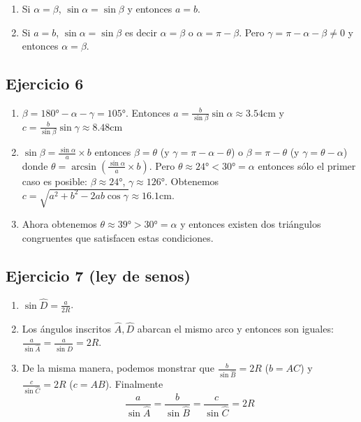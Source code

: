 \begin{enumerate}
  \item Si $\alpha=\beta$, $\sin \alpha = \sin \beta$ y
    entonces $a=b$.
  \item Si $a=b$, $\sin \alpha = \sin \beta$ es decir
    $\alpha = \beta$ o $\alpha = \pi - \beta$.
    Pero $\gamma = \pi - \alpha - \beta \neq 0$ y entonces $\alpha = \beta$.
\end{enumerate}

\subsection{Ejercicio 6}

\begin{enumerate}
\item $\beta = 180° - \alpha - \gamma = 105°$. Entonces
$a = \frac{b}{\sin \beta} \sin \alpha \approx
3.54 \text{cm}$ y
$c = \frac{b}{\sin \beta} \sin \gamma \approx 8.48 \text{cm}$

\item $\sin \beta = \frac{\sin \alpha}{a} \times b$
  entonces $\beta = \theta$ (y $\gamma = \pi - \alpha - \theta$) o
  $\beta = \pi - \theta$ (y $\gamma = \theta - \alpha$) donde
  $\theta = \arcsin \left(\frac{\sin \alpha}{a} \times b\right)$.
  Pero $\theta \approx 24° < 30° = \alpha$ entonces sólo el primer caso
  es posible: $\beta \approx 24°$, $\gamma \approx 126°$.
  Obtenemos 
    $c = \sqrt{a^2 + b^2 - {2ab \cos \gamma}} \approx 16.1\text{cm}$.

\item Ahora obtenemos $\theta \approx 39° > 30° = \alpha$ y entonces
  existen dos triángulos congruentes que satisfacen estas condiciones.
  
\end{enumerate}

\subsection{Ejercicio 7 (ley de senos)}

\begin{enumerate}
\item $\sin \widehat{D} = \frac{a}{2R}$.
\item Los ángulos inscritos $\widehat{A}, \widehat{D}$ 
  abarcan el mismo arco y entonces son iguales:
  $\frac{a}{\sin \widehat{A}} = \frac{a}{\sin \widehat{D}} = 2R$.
\item De la misma manera, podemos monstrar que
  $\frac{b}{\sin \widehat{B}} = 2R$ ($b = AC$) y
  $\frac{c}{\sin \widehat{C}} = 2R$ ($c = AB$). Finalmente
$$
\frac{a}{\sin \widehat{A}} = \frac{b}{\sin \widehat{B}} = 
\frac{c}{\sin \widehat{C}} = 2R
$$

\end{enumerate}

